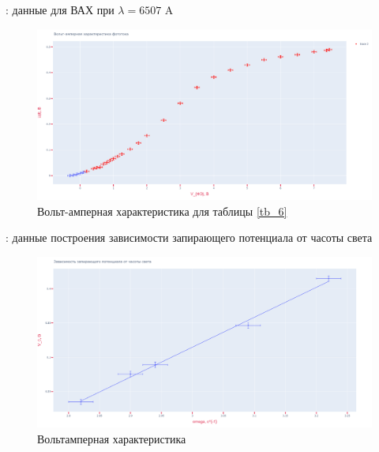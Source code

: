 \documentclass[15pt,a5paper,reqno]{article}
\begin{document}
	\begin{table}[h!]
        \centering
        
        \caption{: данные для ВАХ при $\lambda = 6507$ A}
    	\label{tb_6}
	\end{table}

	\begin{figure}[h!]
		\centering
		\includegraphics[width=1.0\linewidth]{pics/vac_5.png}
		\caption{Вольт-амперная характеристика для таблицы \ref{tb_6}}
		\label{vac5}
	\end{figure}

	\newpage


	\begin{table}[h!]
        \centering
        
        \caption{: данные построения зависимости запирающего потенциала от часоты света}
    	\label{tb_7}
	\end{table}

	\begin{figure}[h!]
		\centering
		\includegraphics[width=1.0\linewidth]{pics/h_calc.png}
		\caption{Вольтамперная характеристика}
		\label{h_calc}
	\end{figure}
\end{document}
